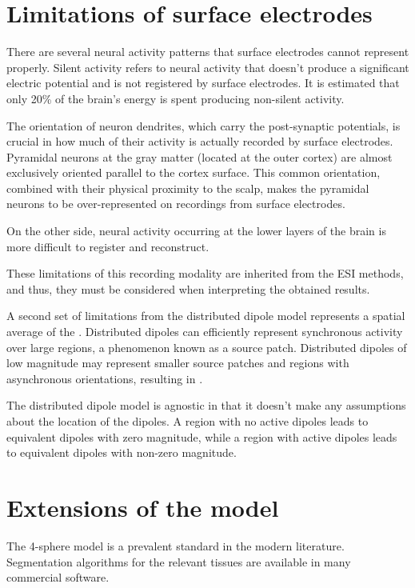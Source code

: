 \section{Limitations of surface electrodes}



There are several neural activity patterns that surface electrodes cannot represent properly.
%
Silent activity refers to neural activity that doesn't produce a significant electric potential and is not registered by surface electrodes.
%
It is estimated that only 20\% of the brain's energy is spent producing non-silent activity.

The orientation of neuron dendrites, which carry the post-synaptic potentials, is crucial in how much of their activity is actually recorded by surface electrodes.
%
Pyramidal neurons at the gray matter (located at the outer cortex) are almost exclusively oriented parallel to the cortex surface.
%
This common orientation, combined with their physical proximity to the scalp, makes the pyramidal neurons to be over-represented on recordings from surface electrodes.

On the other side, neural activity occurring at the lower layers of the brain is more difficult to register and reconstruct.

These limitations of this recording modality are inherited from the ESI methods, and thus, they must be considered when interpreting the obtained results.

A second set of limitations from the distributed dipole model represents a spatial average of the .
%
Distributed dipoles can efficiently represent synchronous activity over large regions, a phenomenon known as a source patch.
%
Distributed dipoles of low magnitude may represent smaller source patches and regions with asynchronous orientations, resulting in .




%
The distributed dipole model is agnostic in that it doesn't make any assumptions about the location of the dipoles.
%
A region with no active dipoles leads to equivalent dipoles with zero magnitude, while a region with active dipoles leads to equivalent dipoles with non-zero magnitude.

\section{Extensions of the model}

The 4-sphere model is a prevalent standard in the modern literature.
%
Segmentation algorithms for the relevant tissues are available in many commercial software.


